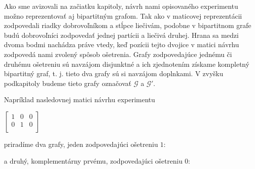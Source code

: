 Ako sme avizovali na začiatku kapitoly, návrh nami opisovaného experimentu možno reprezentovať aj bipartitným grafom.
Tak ako v maticovej reprezentácii zodpovedali riadky dobrovoľníkom a stĺpce liečivám, podobne v bipartitnom grafe budú dobrovoľníci 
zodpovedať jednej partícii a liečivá druhej. Hrana sa medzi dvoma bodmi nachádza práve vtedy, keď pozícii tejto dvojice v matici návrhu zodpovedá nami zvolený spôsob ošetrenia.
Grafy zodpovedajúce jednému či druhému ošetreniu sú navzájom disjunktné a ich zjednotením získame kompletný bipartitný graf, t. j. tieto dva grafy sú si navzájom doplnkami.
V zvyšku podkapitoly budeme tieto grafy označovať $\mathcal{G}$ a $\mathcal{G}'$.

Napríklad nasledovnej matici návrhu experimentu

\begin{center}
$
\begin{bmatrix}
1 & 0 & 0 \\
0 & 1 & 0 \\
\end{bmatrix}
$
\end{center}

priradíme dva grafy, jeden zodpovedajúci ošetreniu $1$:

\begin{center}


\end{center}

a druhý, komplementárny prvému, zodpovedajúci ošetreniu $0$:

